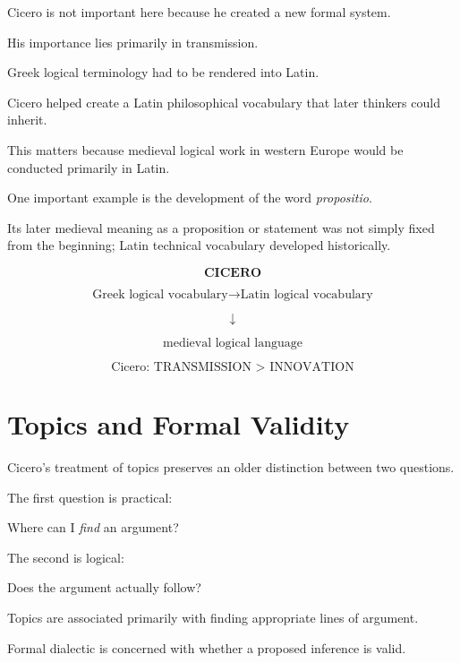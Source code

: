 \documentclass[11pt]{article}
\newcommand{\latin}[1]{\textit{#1}}
\begin{document}
Cicero is not important here because he created a new formal
system.

His importance lies primarily in transmission.

Greek logical terminology had to be rendered into Latin.

Cicero helped create a Latin philosophical vocabulary that later
thinkers could inherit.

This matters because medieval logical work in western Europe
would be conducted primarily in Latin.

One important example is the development of the word
\latin{propositio}.

Its later medieval meaning as a proposition or statement was not
simply fixed from the beginning; Latin technical vocabulary
developed historically.

\begin{whiteboard}
\[
\textbf{CICERO}
\]

\[
\text{Greek logical vocabulary}
\longrightarrow
\text{Latin logical vocabulary}
\]

\[
\downarrow
\]

\[
\text{medieval logical language}
\]

\[
\boxed{\text{Cicero: TRANSMISSION $>$ INNOVATION}}
\]
\end{whiteboard}

\section{Topics and Formal Validity}

Cicero's treatment of topics preserves an older distinction
between two questions.

The first question is practical:

\begin{center}
Where can I \emph{find} an argument?
\end{center}

The second is logical:

\begin{center}
Does the argument actually follow?
\end{center}

Topics are associated primarily with finding appropriate lines of
argument.

Formal dialectic is concerned with whether a proposed inference
is valid.
\end{document}

